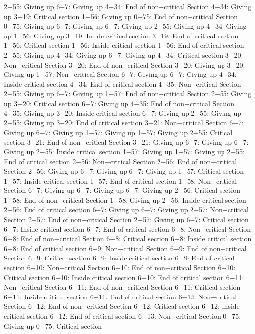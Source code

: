 2−55: Giving up
6−7: Giving up
4−34: End of non−critical Section
4−34: Giving up
3−19: Critical section
1−56: Giving up
0−75: End of non−critical Section
0−75: Giving up
6−7: Giving up
6−7: Giving up
2−55: Giving up
4−34: Giving up
1−56: Giving up
3−19: Inside critical section
3−19: End of critical section
1−56: Critical section
1−56: Inside critical section
1−56: End of critical section
2−55: Giving up
4−34: Giving up
6−7: Giving up
4−34: Critical section
3−20: Non−critical Section
3−20: End of non−critical Section
3−20: Giving up
3−20: Giving up
1−57: Non−critical Section
6−7: Giving up
6−7: Giving up
4−34: Inside critical section
4−34: End of critical section
4−35: Non−critical Section
2−55: Giving up
6−7: Giving up
1−57: End of non−critical Section
2−55: Giving up
3−20: Critical section
6−7: Giving up
4−35: End of non−critical Section
4−35: Giving up
3−20: Inside critical section
6−7: Giving up
2−55: Giving up
2−55: Giving up
3−20: End of critical section
3−21: Non−critical Section
6−7: Giving up
6−7: Giving up
1−57: Giving up
1−57: Giving up
2−55: Critical section
3−21: End of non−critical Section
3−21: Giving up
6−7: Giving up
6−7: Giving up
2−55: Inside critical section
1−57: Giving up
1−57: Giving up
2−55: End of critical section
2−56: Non−critical Section
2−56: End of non−critical Section
2−56: Giving up
6−7: Giving up
6−7: Giving up
1−57: Critical section
1−57: Inside critical section
1−57: End of critical section
1−58: Non−critical Section
6−7: Giving up
6−7: Giving up
6−7: Giving up
2−56: Critical section
1−58: End of non−critical Section
1−58: Giving up
2−56: Inside critical section
2−56: End of critical section
6−7: Giving up
6−7: Giving up
2−57: Non−critical Section
2−57: End of non−critical Section
2−57: Giving up
6−7: Critical section
6−7: Inside critical section
6−7: End of critical section
6−8: Non−critical Section
6−8: End of non−critical Section
6−8: Critical section
6−8: Inside critical section
6−8: End of critical section
6−9: Non−critical Section
6−9: End of non−critical Section
6−9: Critical section
6−9: Inside critical section
6−9: End of critical section
6−10: Non−critical Section
6−10: End of non−critical Section
6−10: Critical section
6−10: Inside critical section
6−10: End of critical section
6−11: Non−critical Section
6−11: End of non−critical Section
6−11: Critical section
6−11: Inside critical section
6−11: End of critical section
6−12: Non−critical Section
6−12: End of non−critical Section
6−12: Critical section
6−12: Inside critical section
6−12: End of critical section
6−13: Non−critical Section
0−75: Giving up
0−75: Critical section
